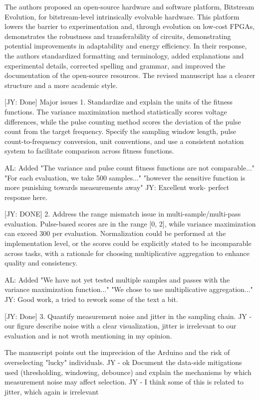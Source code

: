 The authors proposed an open-source hardware and software platform, Bitstream Evolution, for bitstream-level intrinsically evolvable hardware. This platform lowers the barrier to experimentation and, through evolution on low-cost FPGAs, demonstrates the robustness and transferability of circuits, demonstrating potential improvements in adaptability and energy efficiency.
In their response, the authors standardized formatting and terminology, added explanations and experimental details, corrected spelling and grammar, and improved the documentation of the open-source resources. The revised manuscript has a clearer structure and a more academic style.


[JY: Done]
Major issues
1. Standardize and explain the units of the fitness functions. The variance maximization method statistically scores voltage differences, while the pulse counting method scores the deviation of the pulse count from the target frequency. Specify the sampling window length, pulse count-to-frequency conversion, unit conventions, and use a consistent notation system to facilitate comparison across fitness functions.

AL: Added "The variance and pulse count fitness functions are not comparable..." "For each evaluation, we take 500 samples..." "however the sensitive function is more punishing towards measurements away" 
JY: Excellent work- perfect response here.


[JY: DONE]
2. Address the range mismatch issue in multi-sample/multi-pass evaluation. Pulse-based scores are in the range [0, 2], while variance maximization can exceed 300 per evaluation. Normalization could be performed at the implementation level, or the scores could be explicitly stated to be incomparable across tasks, with a rationale for choosing multiplicative aggregation to enhance quality and consistency.

AL: Added "We have not yet tested multiple samples and passes with the variance maximization function..." "We chose to use multiplicative aggregation..."
JY: Good work, a tried to rework some of the text a bit.


[JY: Done]
3. Quantify measurement noise and jitter in the sampling chain.
JY - our figure describe noise with a clear visualization, jitter is irrelevant to our evaluation and is not wroth mentioning in my opinion.

The manuscript points out the imprecision of the Arduino and the risk of overselecting "lucky" individuals. 
JY - ok
Document the data-side mitigations used (thresholding, windowing, debounce) and explain the mechanisms by which measurement noise may affect selection.
JY - I think some of this is related to jitter, which again is irrelevant


